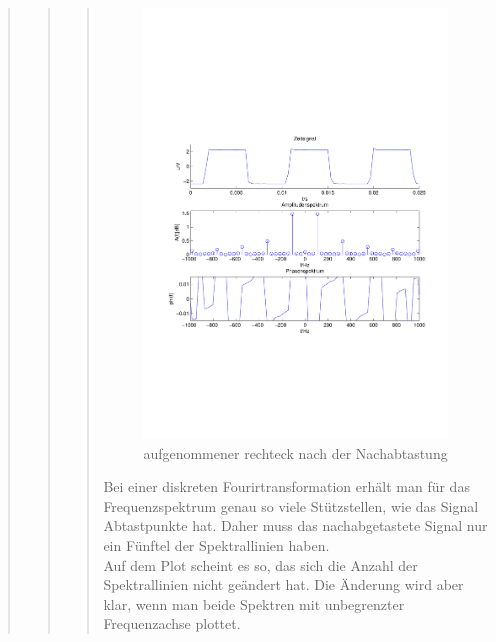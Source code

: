 \begin{quote}
\begin{quote}
\begin{quote}
            \begin{figure}[H]
            \centering
                \includegraphics[scale=0.7, trim = 1.5cm 6.5cm 1cm 7.5cm,
                clip]{./Bilder/rechteck_100Hz_15kHz_3kHz_nachabgetastet_frequenzbegrenzung.pdf}
                    \caption{aufgenommener rechteck nach der Nachabtastung}
            \end{figure}
  
            Bei einer diskreten Fourirtransformation erhält man für das Frequenzspektrum genau so viele
            Stützstellen, wie das Signal Abtastpunkte hat. Daher muss das nachabgetastete Signal nur ein    
            Fünftel der Spektrallinien haben.\\
            Auf dem Plot scheint es so, das sich die Anzahl der Spektrallinien nicht geändert hat. Die Änderung 
            wird aber klar, wenn man beide Spektren mit unbegrenzter Frequenzachse plottet.
            

\end{quote}
\end{quote}
\end{quote}
